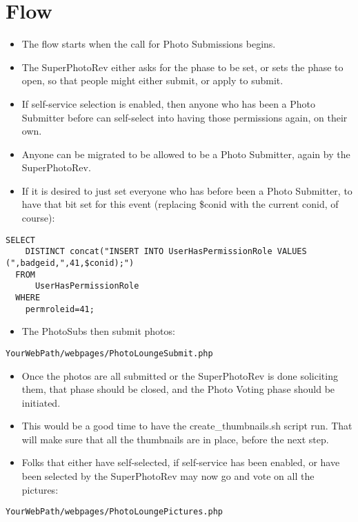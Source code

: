 \documentclass[captions=tablesignature]{scrartcl}
\begin{document}
\section{Flow}
\label{sec-5}
\begin{itemize}
\item The flow starts when the call for Photo Submissions begins.
\item The SuperPhotoRev either asks for the phase to be set, or sets the
phase to open, so that people might either submit, or apply to
submit.
\item If self-service selection is enabled, then anyone who has been a
Photo Submitter before can self-select into having those
permissions again, on their own.
\item Anyone can be migrated to be allowed to be a Photo Submitter,
again by the SuperPhotoRev.
\item If it is desired to just set everyone who has before been a Photo
Submitter, to have that bit set for this event (replacing \$conid
with the current conid, of course):
\end{itemize}
\begin{verbatim}
SELECT
    DISTINCT concat("INSERT INTO UserHasPermissionRole VALUES (",badgeid,",41,$conid);")
  FROM
      UserHasPermissionRole
  WHERE
    permroleid=41;
\end{verbatim}
\begin{itemize}
\item The PhotoSubs then submit photos:
\end{itemize}
\begin{verbatim}
YourWebPath/webpages/PhotoLoungeSubmit.php
\end{verbatim}
\begin{itemize}
\item Once the photos are all submitted or the SuperPhotoRev is done
soliciting them, that phase should be closed, and the Photo Voting
phase should be initiated.
\item This would be a good time to have the create\_thumbnails.sh script
run.  That will make sure that all the thumbnails are in place,
before the next step.
\item Folks that either have self-selected, if self-service has been
enabled, or have been selected by the SuperPhotoRev may now go and
vote on all the pictures:
\end{itemize}
\begin{verbatim}
YourWebPath/webpages/PhotoLoungePictures.php
\end{verbatim}
\end{document}
